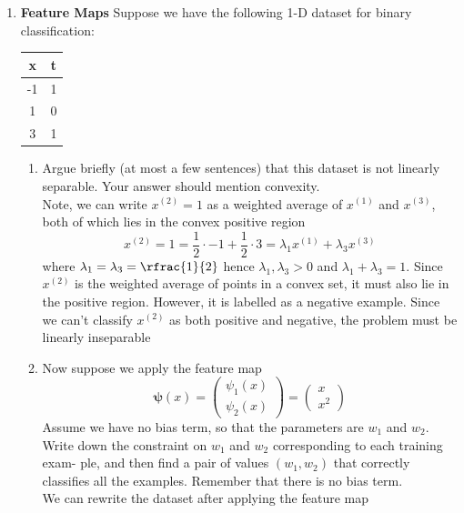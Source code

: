 \documentclass[11pt]{article}
\begin{document}
\begin{enumerate}
\item \textbf{Feature Maps}  Suppose we have the following 1-D dataset for binary classification:


\begin{center}
    \begin{tabular}{ c | c }
     x & t \\ 
     \hline
     -1 & 1 \\  
     1 & 0 \\
     3 & 1 \\
    \end{tabular}
\end{center}

\begin{enumerate}
    \item Argue briefly (at most a few sentences) that this dataset is not linearly separable. Your answer should mention convexity. \\
    Note, we can write $x^{(2)}=1$ as a weighted average of $x^{(1)}$ and $x^{(3)}$, both of which lies in the convex positive region
    \[
        x^{(2)} = 1 = \frac{1}{2} \cdot -1 + \frac{1}{2} \cdot 3 = \lambda_1 x^{(1)} + \lambda_3 x^{(3)}
    \]
    where $\lambda_1 = \lambda_3 = \rfrac{1}{2}$ hence $\lambda_1, \lambda_3 > 0$ and $\lambda_1+\lambda_3 = 1$. Since $x^{(2)}$ is the weighted average of points in a convex set, it must also lie in the positive region. However, it is labelled as a negative example. Since we can't classify $x^{(2)}$ as both positive and negative, the problem must be linearly inseparable
    \item Now suppose we apply the feature map
    \[
        \boldsymbol{\psi}(x) = 
        \begin{pmatrix}
            \psi_1(x) \\ \psi_2(x)
        \end{pmatrix}
        = 
        \begin{pmatrix}
            x \\ x^2
        \end{pmatrix}
    \]
    Assume we have no bias term, so that the parameters are $w_1$ and $w_2$. Write down the constraint on $w_1$ and $w_2$ corresponding to each training exam- ple, and then find a pair of values $(w_1,w_2)$ that correctly classifies all the examples. Remember that there is no bias term.\\
    We can rewrite the dataset after applying the feature map 
    \begin{center}
        \begin{tabular}{c c | c}

\end{tabular}
\end{center}
\end{enumerate}
\end{enumerate}
\end{document}
